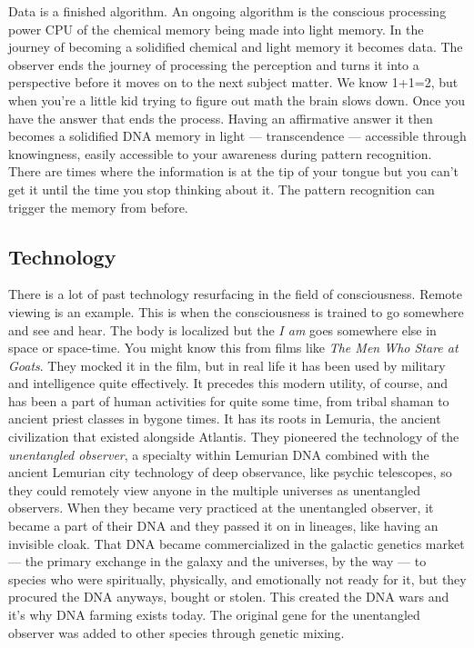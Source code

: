 \documentclass[letterpaper,11pt,twoside,titlepage,onecolumn,openany]{book}
\begin{document}
Data is a finished algorithm. An ongoing algorithm is the conscious
processing power CPU of the chemical memory being made into light
memory. In the journey of becoming a solidified chemical and light
memory it becomes data. The observer ends the journey of processing the
perception and turns it into a perspective before it moves on to the
next subject matter. We know 1+1=2, but when you're a little kid trying
to figure out math the brain slows down. Once you have the answer that
ends the process. Having an affirmative answer it then becomes a
solidified DNA memory in light --- transcendence --- accessible through
knowingness, easily accessible to your awareness during pattern
recognition. There are times where the information is at the tip of your
tongue but you can't get it until the time you stop thinking about it.
The pattern recognition can trigger the memory from before.

\subsection*{Technology}\label{technology}

There is a lot of past technology resurfacing in the field of
consciousness. Remote viewing is an example. This is when the
consciousness is trained to go somewhere and see and hear. The body is
localized but the \emph{I am} goes somewhere else in space or
space-time. You might know this from films like \emph{The Men Who Stare
at Goats}. They mocked it in the film, but in real life it has been used
by military and intelligence quite effectively. It precedes this modern
utility, of course, and has been a part of human activities for quite
some time, from tribal shaman to ancient priest classes in bygone times.
It has its roots in Lemuria, the ancient civilization that existed
alongside Atlantis. They pioneered the technology of the
\emph{unentangled observer}, a specialty within Lemurian DNA combined
with the ancient Lemurian city technology of deep observance, like
psychic telescopes, so they could remotely view anyone in the multiple
universes as unentangled observers. When they became very practiced at
the unentangled observer, it became a part of their DNA and they passed
it on in lineages, like having an invisible cloak. That DNA became
commercialized in the galactic genetics market --- the primary exchange
in the galaxy and the universes, by the way --- to species who were
spiritually, physically, and emotionally not ready for it, but they
procured the DNA anyways, bought or stolen. This created the DNA wars
and it's why DNA farming exists today. The original gene for the
unentangled observer was added to other species through genetic mixing.
\end{document}
